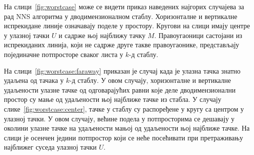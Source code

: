 \documentclass[master]{finthesis}
\newcommand*{\kd}{\texorpdfstring{$k$}{k}-д }
\begin{document}
На слици~\ref{fig:worstcase} може се видети приказ наведених најгорих случајева за рад NNS алгоритма у дводимензионалном стаблу. Хоризонталне и вертикалне испрекидане линије означавају поделе у простору. Кругови на слици имају центре у улазној тачки $U$ и садрже њој најближу тачку $M$. Правоугаоници састојани из испрекиданих линија, који не садрже друге такве правоугаонике, представљају појединачне потпросторе сваког листа у \kd стаблу.

На слици~\ref{fig:worstcase:faraway} приказан је случај када је улазна тачка знатно удаљена од тачака у \kd стаблу. У овом случају, хоризонталне и вертикалне удаљености улазне тачке од одговарајућих равни које деле дводимензионални простор су мање од удаљености њој најближе тачке из стабла. У случају слике~\ref{fig:worstcase:center}, тачке у стаблу су распоређене у кругу са центром у улазној тачки. У овом случају, већине подела у потпросторима се дешавају у околини улазне тачке на удаљености мањој од удаљености њој најближе тачке. На слици је осенчен једини потпростор који се неће посећивати при претраживању најближег суседа улазној тачки $U$.
\end{document}
